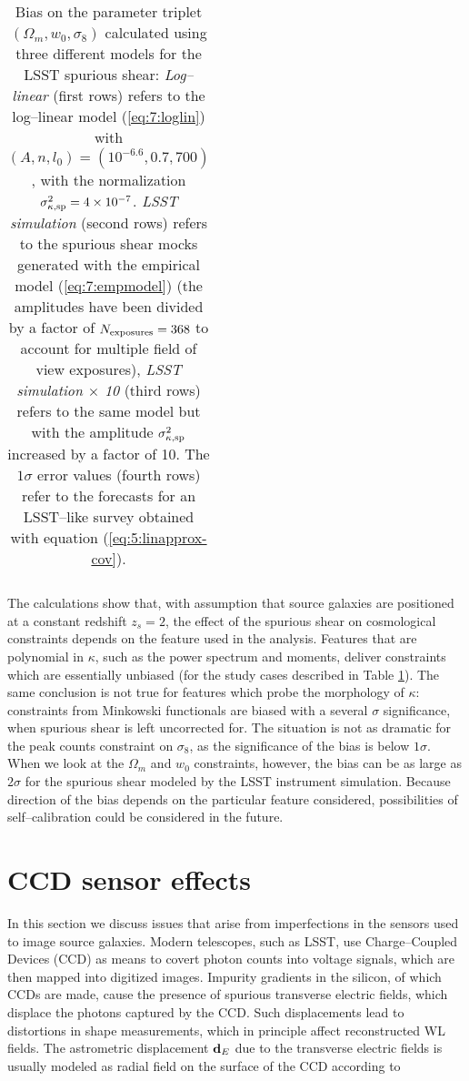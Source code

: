 \begin{table}
\begin{center}
\begin{tabular}{c|ccc}
\end{tabular}
\end{center}

\caption{Bias on the parameter triplet $(\Omega_m,w_0,\sigma_8)$ calculated using three different models for the LSST spurious shear: \textit{Log--linear} (first rows) refers to the log--linear model (\ref{eq:7:loglin}) with $(A,n,l_0)=(10^{-6.6},0.7,700)$, with the normalization $\sigma^2_{\kappa,{\rm sp}}=4\times10^{-7}$. \textit{LSST simulation} (second rows) refers to the spurious shear mocks generated with the empirical model (\ref{eq:7:empmodel}) (the amplitudes have been divided by a factor of $N_{\rm exposures}=368$ to account for multiple field of view exposures), \textit{LSST simulation $\times$ 10} (third rows) refers to the same model but with the amplitude $\sigma^2_{\kappa,{\rm sp}}$ increased by a factor of 10. The $1\sigma$ error values (fourth rows) refer to the forecasts for an LSST--like survey obtained with equation (\ref{eq:5:linapprox-cov}).}
\label{tab:7:spbias}
\end{table}
%
The calculations show that, with assumption that source galaxies are positioned at a constant redshift $z_s=2$, the effect of the spurious shear on cosmological constraints depends on the feature used in the analysis. Features that are polynomial in $\kappa$, such as the power spectrum and moments, deliver constraints which are essentially unbiased (for the study cases described in Table \ref{tab:7:spbias}). The same conclusion is not true for features which probe the morphology of $\kappa$: constraints from Minkowski functionals are biased with a several $\sigma$ significance, when spurious shear is left uncorrected for. The situation is not as dramatic for the peak counts constraint on $\sigma_8$, as the significance of the bias is below $1\sigma$. When we look at the $\Omega_m$ and $w_0$ constraints, however, the bias can be as large as $2\sigma$ for the spurious shear modeled by the LSST instrument simulation. Because direction of the bias depends on the particular feature considered, possibilities of self--calibration could be considered in the future.

\section{CCD sensor effects}
\label{sec:7:ccd}
In this section we discuss issues that arise from imperfections in the sensors used to image source galaxies. Modern telescopes, such as LSST, use Charge--Coupled Devices (CCD) \citep{CCDBook,LSST,LSSTOperations} as means to covert photon counts into voltage signals, which are then mapped into digitized images. Impurity gradients in the silicon, of which CCDs are made, cause the presence of spurious transverse electric fields, which displace the photons captured by the CCD. Such displacements lead to distortions in shape measurements, which in principle affect reconstructed WL fields. The astrometric displacement $\mathbf{d}_E$ due to the transverse electric fields is usually modeled as radial field \citep{PetriCCD} on the surface of the CCD according to

